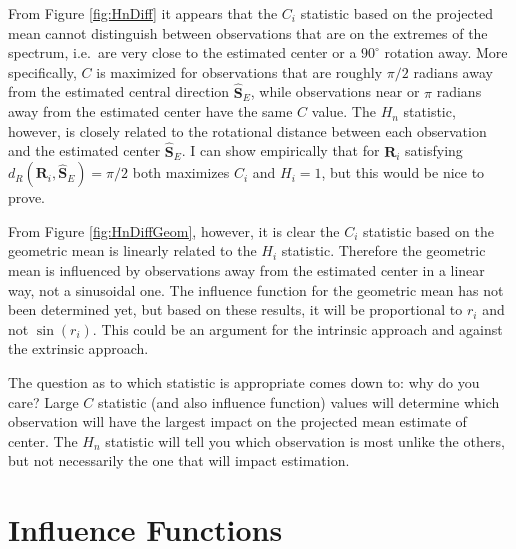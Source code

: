 \documentclass{article}\usepackage[]{graphicx}\usepackage[]{color}
\newcommand{\ProjMean}{{\widehat{\bm S}_{E}}}
\begin{document}
From Figure \ref{fig:HnDiff} it appears that the $C_i$ statistic based on the projected mean cannot distinguish between observations that are on the extremes of the spectrum, i.e.~are very close to the estimated center or a $90^\circ$ rotation away.  More specifically, $C$ is maximized for observations that are roughly $\pi/2$ radians away from the estimated central direction $\ProjMean$, while observations near or $\pi$ radians away from the estimated center have the same $C$ value.  %
The $H_n$ statistic, however, is closely related to the rotational distance between each observation and the estimated center $\ProjMean$.  I can show empirically that for $\bm R_i$ satisfying $d_R(\bm R_i,\ProjMean)=\pi/2$ both maximizes $C_i$ and $H_i=1$, but this would be nice to prove. 

From Figure \ref{fig:HnDiffGeom}, however, it is clear the $C_i$ statistic based on the geometric mean is linearly related to the $H_i$ statistic.  Therefore the geometric mean is influenced by observations away from the estimated center in a linear way, not a sinusoidal one.  The influence function for the geometric mean has not been determined yet, but based on these results, it will be proportional to $r_i$ and not $\sin(r_i)$.  This could be an argument for the intrinsic approach and against the extrinsic approach.


The question as to which statistic is appropriate comes down to: why do you care?  Large $C$ statistic (and also influence function) values will determine which observation will have the largest impact on the projected mean estimate of center.  The $H_n$ statistic will tell you which observation is most unlike the others, but not necessarily the one that will impact estimation.

\section{Influence Functions}\label{sec:ifs}
\end{document}
